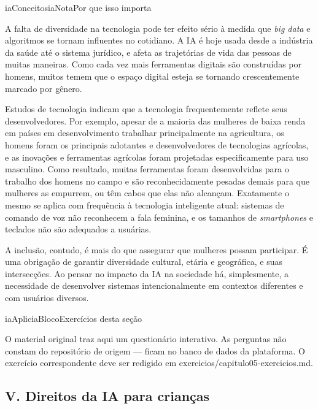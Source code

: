 \documentclass[
  11pt,
]{article}
\renewcommand{\texttt}[1]{{\color{iaAmeixa}\small\ttfamily #1}}
\newenvironment{nota}[1][Nota]{\begin{iabox}{iaConceitos}{iaNota}{#1}}{\end{iabox}}
\newenvironment{reflexao}[1][Para pensar]{\begin{iabox}{iaAplic}{iaBloco}{#1}}{\end{iabox}}
\begin{document}
\begin{nota}[Por que isso importa]

A falta de diversidade na tecnologia pode ter efeito sério à medida que
\emph{big data} e algoritmos se tornam influentes no cotidiano. A IA é
hoje usada desde a indústria da saúde até o sistema jurídico, e afeta as
trajetórias de vida das pessoas de muitas maneiras. Como cada vez mais
ferramentas digitais são construídas por homens, muitos temem que o
espaço digital esteja se tornando crescentemente marcado por gênero.

\end{nota}

Estudos de tecnologia indicam que a tecnologia frequentemente reflete
seus desenvolvedores. Por exemplo, apesar de a maioria das mulheres de
baixa renda em países em desenvolvimento trabalhar principalmente na
agricultura, os homens foram os principais adotantes e desenvolvedores
de tecnologias agrícolas, e as inovações e ferramentas agrícolas foram
projetadas especificamente para uso masculino. Como resultado, muitas
ferramentas foram desenvolvidas para o trabalho dos homens no campo e
são reconhecidamente pesadas demais para que mulheres as empurrem, ou
têm cabos que elas não alcançam. Exatamente o mesmo se aplica com
frequência à tecnologia inteligente atual: sistemas de comando de voz
não reconhecem a fala feminina, e os tamanhos de \emph{smartphones} e
teclados não são adequados a usuárias.

A inclusão, contudo, é mais do que assegurar que mulheres possam
participar. É uma obrigação de garantir diversidade cultural, etária e
geográfica, e suas intersecções. Ao pensar no impacto da IA na sociedade
há, simplesmente, a necessidade de desenvolver sistemas intencionalmente
em contextos diferentes e com usuários diversos.

\begin{reflexao}[Exercícios desta seção]

O material original traz aqui um questionário interativo. As perguntas
não constam do repositório de origem --- ficam no banco de dados da
plataforma. O exercício correspondente deve ser redigido em
\texttt{exercicios/capitulo05-exercicios.md}.

\end{reflexao}

\subsection{V. Direitos da IA para
crianças}\label{v.-direitos-da-ia-para-crianuxe7as}
\end{document}
